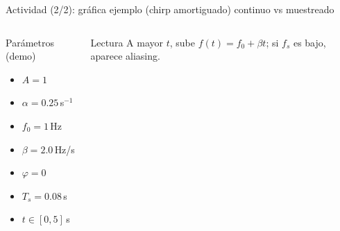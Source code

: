 \documentclass[aspectratio=169,10pt]{beamer}
\newcommand{\importantbox}[2][Importante]{%
\begin{alertblock}{#1}#2\end{alertblock}}
\begin{document}
\begin{frame}{Actividad (2/2): gráfica ejemplo (chirp amortiguado) continuo vs muestreado}
\small
\begin{columns}[T]
\begin{block}{Parámetros (demo)}
\begin{itemize}
\item $A=1$
\item $\alpha=0.25\,$s$^{-1}$
\item $f_0=1\,$Hz
\item $\beta=2.0\,$Hz/s
\item $\varphi=0$
\item $T_s=0.08\,$s
\item $t\in[0,5]\,$s
\end{itemize}
\end{block}
\importantbox[Lectura]{
A mayor $t$, sube $f(t)=f_0+\beta t$; si $f_s$ es bajo, aparece aliasing.
}

\end{columns}
\end{frame}
\end{document}

